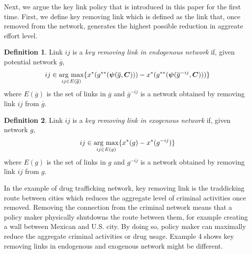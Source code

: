 \documentclass[12pt]{article}
\theoremstyle{definition}
\newtheorem{definition}{Definition}
\newcommand{\bm}[1]{\boldsymbol{#1}}
\newcommand{\argmax}{\mathop{\rm arg~max}\limits}
\begin{document}
Next, we argue the key link policy that is introduced in this paper for the first time.
First, we define key removing link which is defined as the link that, once removed from the network, generates the highest possible reduction in aggreate effort level.

\begin{definition}
	Link $ij$ is a {\it{key removing link in endogenous network}} if, given potential network $\overline{g}$,
    \[ ij \in \argmax_{ij \in E(\overline{g})} \{ x^*(g^{**}(\bm{\psi}(\overline{g}, \bm{C}))) - x^*(g^{**}(\bm{\psi}({\overline{g}}^{-ij}, \bm{C}))) \} \]
    where $E(\overline{g})$ is the set of links in $\overline{g}$ and ${\overline{g}}^{-ij}$ is a network obtained by removing link $ij$ from $\overline{g}$.
\end{definition}

\begin{definition}
	Link $ij$ is a {\it{key removing link in exogenous network}} if, given network $g$,
    \[ ij \in \argmax_{ij \in E(g)} \{ x^*(g) - x^*(g^{-ij}) \} \]
    where $E(g)$ is the set of links in $g$ and $g^{-ij}$ is a network obtained by removing link $ij$ from $g$.
\end{definition}

In the example of drug trafficking network, key removing link is the traddicking route between cities which reduces the aggregate level of criminal activities once removed.
Removing the connection from the criminal network means that a policy maker physically shutdowns the route between them, for example creating a wall between Mexican and U.S. city.
By doing so, policy maker can maximally reduce the aggregate criminal activities or drug usage.
Example 4 shows key removing links in endogenous and exogenous network might be different.
\end{document}
